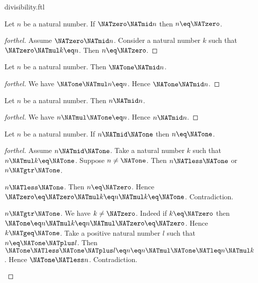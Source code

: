 \documentclass{naproche-library}
\begin{document}
\begin{smodule}[title=Divisibility]{divisibility.ftl}
\begin{proposition}[forthel,id=ARITHMETIC_07_8611150130315264]
  Let $n$ be a natural number.
  If $\NATzero \NATmid n$ then $n \eq \NATzero$.
\end{proposition}
\begin{proof}[forthel]
  Assume $\NATzero \NATmid n$.
  Consider a natural number $k$ such that $\NATzero \NATmul k \eq n$.
  Then $n \eq \NATzero$.
\end{proof}

\begin{proposition}[forthel,id=ARITHMETIC_07_1259086070939648]
  Let $n$ be a natural number.
  Then $\NATone \NATmid n$.
\end{proposition}
\begin{proof}[forthel]
  We have $\NATone \NATmul n \eq n$.
  Hence $\NATone \NATmid n$.
\end{proof}

\begin{proposition}[forthel,id=ARITHMETIC_07_3944887330275328]
  Let $n$ be a natural number.
  Then $n \NATmid n$.
\end{proposition}
\begin{proof}[forthel]
  We have $n \NATmul \NATone \eq n$.
  Hence $n \NATmid n$.
\end{proof}

\begin{proposition}[forthel,id=ARITHMETIC_07_6917446193643520]
  Let $n$ be a natural number.
  If $n \NATmid \NATone$ then $n \eq \NATone$.
\end{proposition}
\begin{proof}[forthel]
  Assume $n \NATmid \NATone$.
  Take a natural number $k$ such that $n \NATmul k \eq \NATone$.
  Suppose $n \neq \NATone$.
  Then $n \NATless \NATone$ or $n \NATgtr \NATone$.

  \begin{case}{$n \NATless \NATone$.}
    Then $n \eq \NATzero$.
    Hence $\NATzero
      \eq \NATzero \NATmul k
      \eq n \NATmul k
      \eq \NATone$.
    Contradiction.
  \end{case}

  \begin{case}{$n \NATgtr \NATone$.}
    We have $k \neq \NATzero$.
    Indeed if $k \eq \NATzero$ then
    $\NATone
      \eq n \NATmul k
      \eq n \NATmul \NATzero
      \eq \NATzero$.
    Hence $k \NATgeq \NATone$.
    Take a positive natural number $l$ such that $n \eq \NATone \NATplus l$.
    Then $\NATone
      \NATless \NATone \NATplus l
      \eq n
      \eq n \NATmul \NATone
      \NATleq n \NATmul k$.
    Hence $\NATone \NATless n$.
    Contradiction.
  \end{case}
\end{proof}


\end{smodule}
\end{document}

